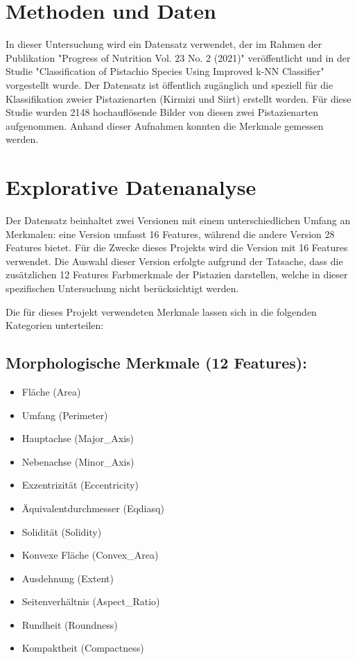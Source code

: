 \section{Methoden und Daten}

In dieser Untersuchung wird ein Datensatz verwendet, der im Rahmen der Publikation "Progress of Nutrition Vol. 23 No. 2 (2021)" veröffentlicht und in der Studie "Classification of Pistachio Species Using Improved k-NN Classifier"\cite{Ozkan.2021} vorgestellt wurde. Der Datensatz ist öffentlich zugänglich und speziell für die Klassifikation zweier Pistazienarten (\glqq{}Kirmizi\grqq{} und \glqq{}Siirt\grqq{}) erstellt worden. Für diese Studie wurden 2148 hochauflösende Bilder von diesen zwei Pistazienarten aufgenommen. Anhand dieser Aufnahmen konnten die Merkmale gemessen werden.

\section*{Explorative Datenanalyse} 
Der Datensatz beinhaltet zwei Versionen mit einem unterschiedlichen Umfang an Merkmalen: eine Version umfasst 16 Features, während die andere Version 28 Features bietet. Für die Zwecke dieses Projekts wird die Version mit 16 Features verwendet. Die Auswahl dieser Version erfolgte aufgrund der Tatsache, dass die zusätzlichen 12 Features Farbmerkmale der Pistazien darstellen, welche in dieser spezifischen Untersuchung nicht berücksichtigt werden.

Die für dieses Projekt verwendeten Merkmale lassen sich in die folgenden Kategorien unterteilen:

\subsection*{Morphologische Merkmale (12 Features):}
\begin{itemize}
	\item Fläche (Area)
	\item Umfang (Perimeter)
	\item Hauptachse (Major\_Axis)
	\item Nebenachse (Minor\_Axis)
	\item Exzentrizität (Eccentricity)
	\item Äquivalentdurchmesser (Eqdiasq)
	\item Solidität (Solidity)
	\item Konvexe Fläche (Convex\_Area)
	\item Ausdehnung (Extent)
	\item Seitenverhältnis (Aspect\_Ratio)
	\item Rundheit (Roundness)
	\item Kompaktheit (Compactness)
\end{itemize}

